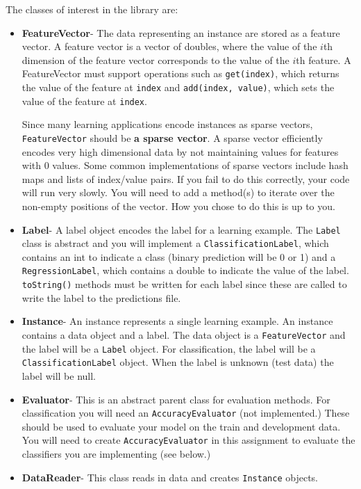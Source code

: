 \documentclass[11pt]{article}
\begin{document}
The classes of interest in the library are:
\begin{itemize}
\item {\bf FeatureVector}- The data representing an instance are stored as a feature vector. A feature vector is a vector of doubles, where the value of the $i$th dimension of the feature vector corresponds to the value of the $i$th feature. A FeatureVector must support operations such as {\tt get(index)}, which returns the value of the feature at {\tt index} and {\tt add(index, value)}, which sets the value of the feature at {\tt index}.

Since many learning applications encode instances as sparse vectors, {\tt FeatureVector} should be {\bf a sparse vector}. A sparse vector efficiently encodes very high dimensional data by not maintaining values for features with 0 values. Some common implementations of sparse vectors include hash maps and lists of index/value pairs. If you fail to do this correctly, your code will run very slowly. You will need to add a method(s) to iterate over the non-empty positions of the vector. How you chose to do this is up to you.

\item {\bf Label}- A label object encodes the label for a learning example. The {\tt Label} class is abstract and you will implement a {\tt ClassificationLabel}, which contains an int to indicate a class (binary prediction will be 0 or 1) and a {\tt RegressionLabel}, which contains a double to indicate the value of the label. {\tt toString()} methods must be written for each label since these are called to write the label to the predictions file.

\item {\bf Instance}- An instance represents a single learning example. An instance contains a data object and a label. The data object is a {\tt FeatureVector} and the label will be a {\tt Label} object. For classification, the label will be a {\tt ClassificationLabel} object. When the label is unknown (test data) the label will be null.

\item {\bf Evaluator}- This is an abstract parent class for evaluation methods. For classification you will need an {\tt AccuracyEvaluator} (not implemented.)
These should be used to evaluate your model on the train and development data. You will need to create {\tt AccuracyEvaluator} in this assignment to
evaluate the classifiers you are implementing (see below.)

\item {\bf DataReader}- This class reads in data and creates {\tt Instance} objects.


\end{itemize}
\end{document}
